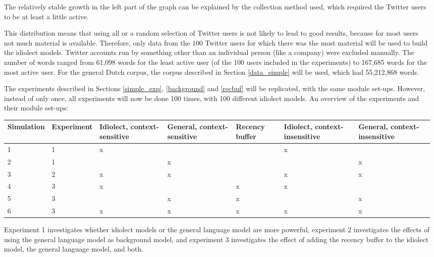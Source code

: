 \documentclass[11pt]{article}
\let\originaltable\table
\let\endoriginaltable\endtable
\renewenvironment{table}[1][ht]{%
  \originaltable[#1]
  \centering}%
  {\endoriginaltable}
\begin{document}
The relatively stable growth in the left part of the graph can be explained by the collection method used, which required the Twitter users to be at least a little active. 

This distribution means that using all or a random selection of Twitter users is not likely to lead to good results, because for most users not much material is available. Therefore, only data from the 100 Twitter users for which there was the most material will be used to build the idiolect models. Twitter accounts run by something other than an individual person (like a company) were excluded manually. The number of words ranged from 61,098 words for the least active user (of the 100 users included in the experiments) to 167,685 words for the most active user. For the general Dutch corpus, the corpus described in Section \ref{data_simple} will be used, which had 55,212,868 words.

The experiments described in Sections \ref{simple_exp}, \ref{background} and \ref{recbuf} will be replicated, with the same module set-ups. However, instead of only once, all experiments will now be done 100 times, with 100 different idiolect models. An overview of the experiments and their module set-ups:


\begin{table}[H] \footnotesize
\begin{tabular}{l|l|p{1.2cm}p{1.2cm}p{1.2cm}p{1.2cm}p{1.2cm}} 
Simulation&Experiment&Idiolect, context-sensitive&General, context-sensitive&Recency buffer&Idiolect, context-insensitive&General, context-insensitive\\
\hline
1&1&x&&&x&\\
2&1&&x&&&x\\

3&2&x&x&&x&x\\

4&3&x&&x&x&\\
5&3&&x&x&&x\\
6&3&x&x&x&x&x\\

\end{tabular} 
\caption{Overview of all module set-ups} 
\end{table}

Experiment 1 investigates whether idiolect models or the general language model are more powerful, experiment 2 investigates the effects of using the general language model as background model, and experiment 3 investigates the effect of adding the recency buffer to the idiolect model, the general language model, and both.
\end{document}
